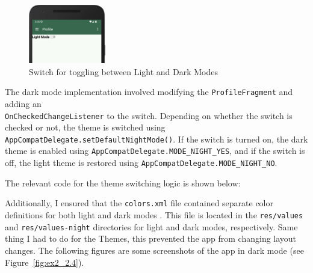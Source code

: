     \begin{figure}[H]
        \centering
        \includegraphics[width=0.30\textwidth]{res/img/dark_theme_switch.png}
        \caption{Switch for toggling between Light and Dark Modes}
        \label{fig:ex2_3}
    \end{figure}

    The dark mode implementation involved modifying the \texttt{ProfileFragment} and adding an \\ \texttt{OnCheckedChangeListener} to the switch. Depending on whether the switch is checked or not, the theme is switched using \texttt{AppCompatDelegate.setDefaultNightMode()}. If the switch is turned on, the dark theme is enabled using \texttt{AppCompatDelegate.MODE\_NIGHT\_YES}, and if the switch is off, the light theme is restored using \texttt{AppCompatDelegate.MODE\_NIGHT\_NO}.

    The relevant code for the theme switching logic is shown below:

    

    Additionally, I ensured that the \texttt{colors.xml} file contained separate color definitions for both light and dark modes . This file is located in the \texttt{res/values} and \texttt{res/values-night} directories for light and dark modes, respectively. Same thing I had to do for the Themes, this prevented the app from changing layout changes. The following figures are some screenshots of the app in dark mode (see Figure~\ref{fig:ex2_2.4}).

